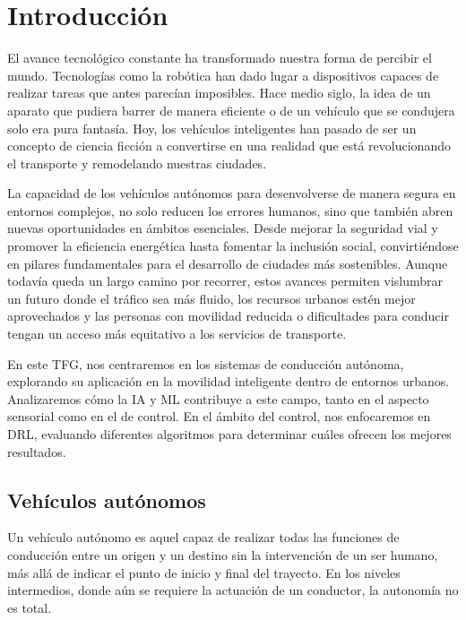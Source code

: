 \chapter{Introducción}
\label{cap:introduccion}
\setcounter{page}{1}

El avance tecnológico constante ha transformado nuestra forma de percibir el mundo. Tecnologías como la robótica han dado lugar a dispositivos capaces de realizar tareas que antes parecían imposibles. Hace medio siglo, la idea de un aparato que pudiera barrer de manera eficiente o de un vehículo que se condujera solo era pura fantasía. Hoy, los vehículos inteligentes han pasado de ser un concepto de ciencia ficción a convertirse en una realidad que está revolucionando el transporte y remodelando nuestras ciudades.

La capacidad de los vehículos autónomos para desenvolverse de manera segura en entornos complejos, no solo reducen los errores humanos, sino que también abren nuevas oportunidades en ámbitos esenciales. Desde mejorar la seguridad vial y promover la eficiencia energética hasta fomentar la inclusión social, convirtiéndose en pilares fundamentales para el desarrollo de ciudades más sostenibles. Aunque todavía queda un largo camino por recorrer, estos avances permiten vislumbrar un futuro donde el tráfico sea más fluido, los recursos urbanos estén mejor aprovechados y las personas con movilidad reducida o dificultades para conducir tengan un acceso más equitativo a los servicios de transporte.

En este \ac{TFG}, nos centraremos en los sistemas de conducción autónoma, explorando su aplicación en la movilidad inteligente dentro de entornos urbanos. Analizaremos cómo la \ac{IA} y \ac{ML} contribuye a este campo, tanto en el aspecto sensorial como en el de control. En el ámbito del control, nos enfocaremos en \ac{DRL}, evaluando diferentes algoritmos para determinar cuáles ofrecen los mejores resultados.

\section{Vehículos autónomos}
\label{sec:vehículos}

Un vehículo autónomo es aquel capaz de realizar todas las funciones de conducción entre un origen y un destino sin la intervención de un ser humano, más allá de indicar el punto de inicio y final del trayecto. En los niveles intermedios, donde aún se requiere la actuación de un conductor, la autonomía no es total.

